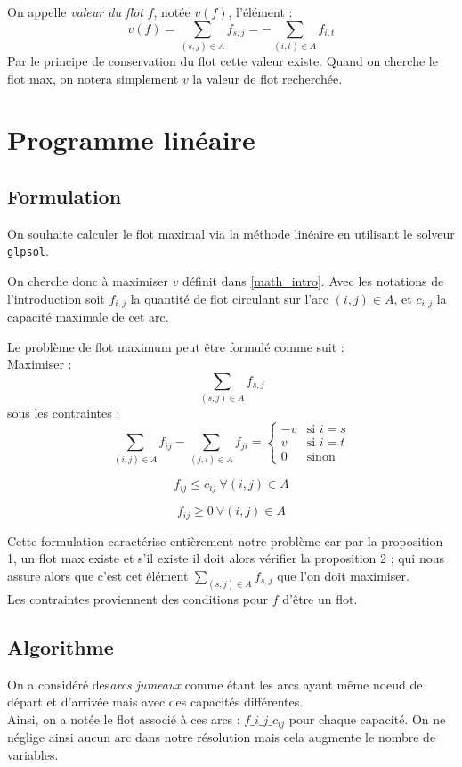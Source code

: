 \documentclass{article}[12pt]
\begin{document}
     
    On appelle {\it valeur du flot} $f$, notée $v(f)$, l'élément : $$v(f) = \sum_{(s,j) \in A} f_{s,j} = -\sum_{(i,t) \in A} f_{i,t}$$
    Par le principe de conservation du flot cette valeur existe. Quand on cherche le flot max, on notera simplement $v$ la valeur de flot recherchée. 


\section{Programme linéaire}
    
\subsection{Formulation}

On souhaite calculer le flot maximal via la méthode linéaire en utilisant le solveur \texttt{glpsol}.

On cherche donc à maximiser $v$ définit dans \ref{math_intro}.
Avec les notations de l'introduction soit $f_{i,j}$ la quantité de flot circulant sur l'arc $(i,j) \in A$, et $c_{i,j}$ la capacité maximale de cet arc.

Le problème de flot maximum peut être formulé comme suit : \\
Maximiser :
$$\sum_{(s,j) \in A} f_{s,j}$$
sous les contraintes :
$$\sum_{(i,j) \in A} f_{ij} - \sum_{(j,i) \in A} f_{ji} =
\begin{cases}
-v & \text{si } i=s \\
v & \text{si } i=t \\
0 & \text{sinon}
\end{cases}$$

$$f_{ij} \leq c_{ij} ~ \forall (i,j) \in A$$

$$f_{ij} \geq 0 ~ \forall (i,j) \in A $$

Cette formulation caractérise entièrement notre problème car par la proposition 1, un flot max existe et s'il existe il doit alors vérifier la proposition 2 ; qui nous assure alors que c'est cet élément $\sum_{(s,j) \in A} f_{s,j}$ que l'on doit maximiser. \\
Les contraintes proviennent des conditions pour $f$ d'être un flot.\\

\subsection{Algorithme}

On a considéré des{\it arcs jumeaux} comme étant les arcs ayant même noeud de départ et d'arrivée mais avec des capacités différentes.\\
Ainsi, on a notée le flot associé à ces arcs : $f\_i\_j\_c_{ij}$ pour chaque capacité. On ne néglige ainsi aucun arc dans notre résolution mais cela augmente le nombre de variables.\\
\end{document}
